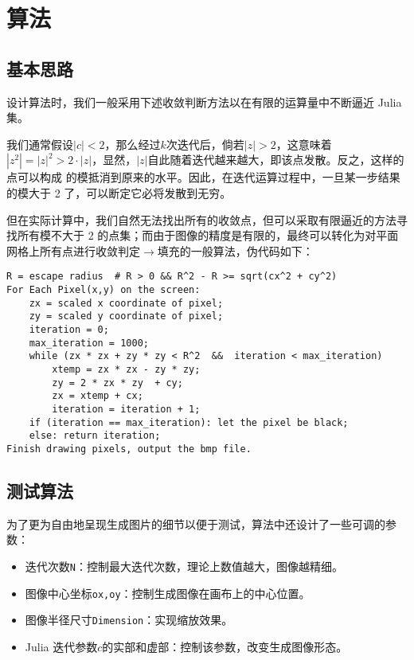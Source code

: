 \section{算法}

\subsection{基本思路}

设计算法时，我们一般采用下述收敛判断方法以在有限的运算量中不断逼近 Julia 集。

我们通常假设$|c|<2$，那么经过$k$次迭代后，倘若$|z|>2$，这意味着
$|z^2|=|z|^2>2\cdot|z|$，显然，$|z|$自此随着迭代越来越大，即该点发散。反之，这样的点可以构成
的模抵消到原来的水平。因此，在迭代运算过程中，一旦某一步结果的模大于 2 了，可以断定它必将发散到无穷。\textsuperscript{\cite{website-julia-mandelbrot}}

但在实际计算中，我们自然无法找出所有的收敛点，但可以采取有限逼近的方法寻找所有模不大于 2 的点集；而由于图像的精度是有限的，最终可以转化为对平面网格上所有点进行收敛判定$\rightarrow$填充的一般算法，伪代码如下：

\begin{lstlisting}
R = escape radius  # R > 0 && R^2 - R >= sqrt(cx^2 + cy^2)
For Each Pixel(x,y) on the screen:
    zx = scaled x coordinate of pixel;
    zy = scaled y coordinate of pixel;
    iteration = 0;
    max_iteration = 1000;
    while (zx * zx + zy * zy < R^2  &&  iteration < max_iteration)
        xtemp = zx * zx - zy * zy;
        zy = 2 * zx * zy  + cy;
        zx = xtemp + cx;
        iteration = iteration + 1;
    if (iteration == max_iteration): let the pixel be black;
    else: return iteration;
Finish drawing pixels, output the bmp file.
\end{lstlisting}

\subsection{测试算法}

为了更为自由地呈现生成图片的细节以便于测试，算法中还设计了一些可调的参数：

\begin{itemize}
    \item 迭代次数\verb|N|：控制最大迭代次数，理论上数值越大，图像越精细。
    \item 图像中心坐标\verb|ox,oy|：控制生成图像在画布上的中心位置。
    \item 图像半径尺寸\verb|Dimension|：实现缩放效果。
    \item Julia 迭代参数$c$的实部和虚部：控制该参数，改变生成图像形态。
\end{itemize}